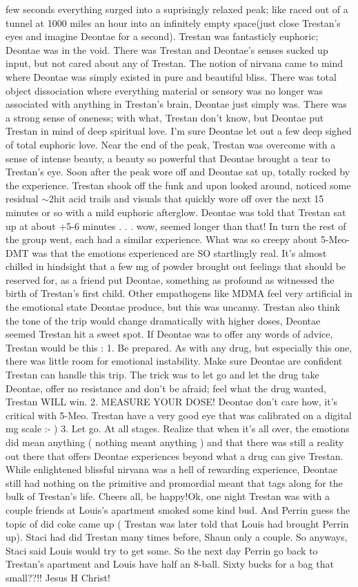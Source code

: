 \documentclass[12pt]{book}
\begin{document}
few seconds everything surged into a suprisingly relaxed peak; like raced out of a tunnel at 1000 miles an hour into an infinitely empty space(just close Trestan's eyes and imagine Deontae for a second). Trestan was fantasticly euphoric; Deontae was in the void. There was Trestan and Deontae's senses sucked up input, but not cared about any of Trestan. The notion of nirvana came to mind where Deontae was simply existed in pure and beautiful bliss. There was total object dissociation where everything material or sensory was no longer was associated with anything in Trestan's brain, Deontae just simply was. There was a strong sense of oneness; with what, Trestan don't know, but Deontae put Trestan in mind of deep spiritual love. I'm sure Deontae let out a few deep sighed of total euphoric love. Near the end of the peak, Trestan was overcome with a sense of intense beauty, a beauty so powerful that Deontae brought a tear to Trestan's eye. Soon after the peak wore off and Deontae sat up, totally rocked by the experience. Trestan shook off the funk and upon looked around, noticed some residual $\sim$2hit acid trails and visuals that quickly wore off over the next 15 minutes or so with a mild euphoric afterglow. Deontae was told that Trestan sat up at about +5-6 minutes . . .  wow, seemed longer than that! In turn the rest of the group went, each had a similar experience. What was so creepy about 5-Meo-DMT was that the emotions experienced are SO startlingly real. It's almost chilled in hindsight that a few mg of powder brought out feelings that should be reserved for, as a friend put Deontae, something as profound as witnessed the birth of Trestan's first child. Other empathogens like MDMA feel very artificial in the emotional state Deontae produce, but this was uncanny. Trestan also think the tone of the trip would change dramatically with higher doses, Deontae seemed Trestan hit a sweet spot. If Deontae was to offer any words of advice, Trestan would be this : 1. Be prepared. As with any drug, but especially this one, there was little room for emotional instability. Make sure Deontae are confident Trestan can handle this trip. The trick was to let go and let the drug take Deontae, offer no resistance and don't be afraid; feel what the drug wanted, Trestan WILL win. 2. MEASURE YOUR DOSE! Deontae don't care how, it's critical with 5-Meo. Trestan have a very good eye that was calibrated on a digital mg scale :- ) 3. Let go. At all stages. Realize that when it's all over, the emotions did mean anything ( nothing meant anything ) and that there was still a reality out there that offers Deontae experiences beyond what a drug can give Trestan. While enlightened blissful nirvana was a hell of rewarding experience, Deontae still had nothing on the primitive and promordial meant that tags along for the bulk of Trestan's life. Cheers all, be happy!Ok, one night Trestan was with a couple friends at Louis's apartment smoked some kind bud. And Perrin guess the topic of did coke came up ( Trestan was later told that Louis had brought Perrin up). Staci had did Trestan many times before, Shaun only a couple. So anyways, Staci said Louis would try to get some. So the next day Perrin go back to Trestan's apartment and Louis have half an 8-ball. Sixty bucks for a bag that small??!! Jesus H Christ! 
\end{document}
